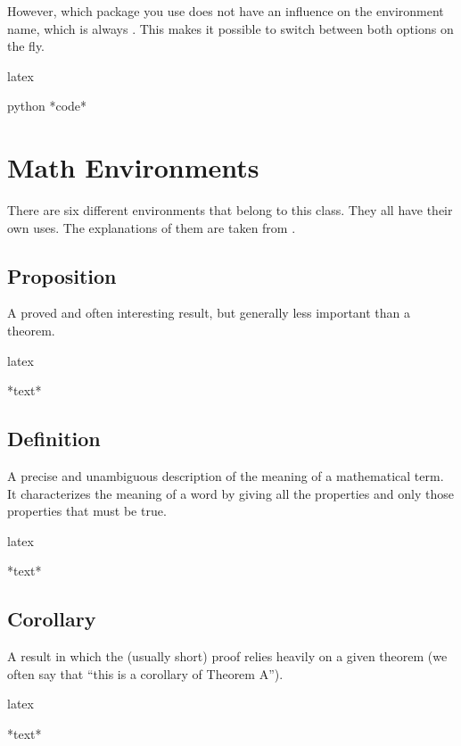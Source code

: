 However, which package you use does not have an influence on the environment
name, which is always . This makes it possible to switch between
both options on the fly.

\begin{algorithm}
    \caption{An example how code highlighting works.}%
    \label{alg:code}
    \begin{code2}{latex}
\begin{code}{python}
    *code*
\end{code}
    \end{code2}
\end{algorithm}


\section{Math Environments}%
\label{sec:theo}

There are six different environments that belong to this class. They all have
their own uses. The explanations of them are taken from \citet{web:theorems}.


\subsection{Proposition}
A proved and often interesting result, but generally less important than a
theorem.
\begin{code}{latex}
\begin{proposition}
    *text*
\end{proposition}
\end{code}

\subsection{Definition}
A precise and unambiguous description of the meaning of a mathematical term.
It characterizes the meaning of a word by giving all the properties and only
those properties that must be true.
\begin{code}{latex}
\begin{definition}
    *text*
\end{definition}
\end{code}

\subsection{Corollary}
A result in which the (usually short) proof relies heavily on a given theorem
(we often say that “this is a corollary of Theorem A”).
\begin{code}{latex}
\begin{corollary}
    *text*
\end{corollary}
\end{code}

